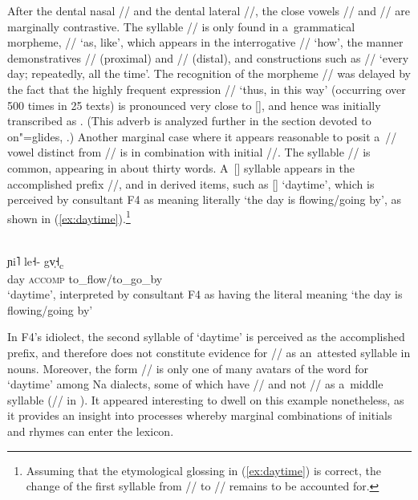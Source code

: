 		After the dental nasal // and the dental lateral //, the close vowels // and
		// are marginally contrastive. The syllable // is only found in a~grammatical
		morpheme, // ‘as, like’, which appears in the interrogative // ‘how’, the
		manner demonstratives // (proximal) and // (distal), and
		constructions such as // ‘every day; repeatedly, all the time’. The
		recognition of the morpheme // was delayed by the fact that the highly frequent expression
		// ‘thus, in this way’ (occurring over 500 times in 25 texts) is pronounced very close to [], and hence
		was initially transcribed as . (This adverb is analyzed further in the section devoted to on"=glides, .) Another marginal case where it appears reasonable to posit a~// vowel distinct from //
		is in combination with initial //. The syllable // is common, appearing in about
		thirty words. A~[] syllable appears in the {accomplished} prefix //, and in
		derived items, such as [] ‘daytime’, which is perceived by consultant F4 as meaning literally ‘the
		day is flowing/going by’, as shown in (\ref{ex:daytime}).\footnote{Assuming that the etymological glossing in (\ref{ex:daytime}) is correct, the
			change of the first syllable from /{\kern1pt}/ to // remains to be accounted for.}
		
			\begin{exe}
				\ex
				\label{ex:daytime}
				\\
				\gll ɲi˥ le˧- gv̩˧\textsubscript{c}\\
				day		\textsc{accomp}		to\_flow/to\_go\_by\\
				\glt ‘daytime’, interpreted by consultant F4 as having the literal meaning ‘the
				day is flowing/going by’
			\end{exe}
		
		In F4's idiolect, the second syllable of ‘daytime’ is perceived as the {accomplished} prefix, and therefore does not constitute evidence for // as
		an~attested syllable in nouns. Moreover, the form // is only one of many avatars of the word for ‘daytime’ among Na dialects, some of which have // and not // as a~middle syllable (// in \citealt[297]{lidz2010}). It appeared interesting to dwell on this example nonetheless, as it provides an insight into processes whereby marginal combinations of initials and rhymes can enter the lexicon.
		
